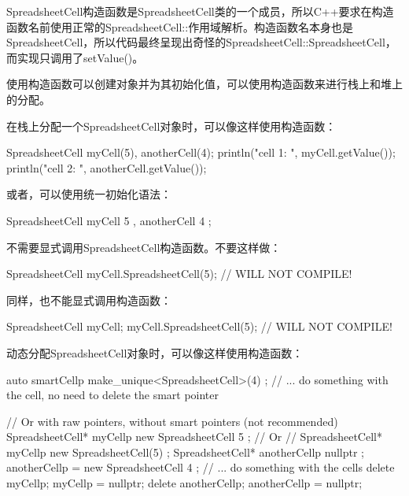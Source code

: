 SpreadsheetCell构造函数是SpreadsheetCell类的一个成员，所以C++要求在构造函数名前使用正常的SpreadsheetCell::作用域解析。构造函数名本身也是SpreadsheetCell，所以代码最终呈现出奇怪的SpreadsheetCell::SpreadsheetCell，而实现只调用了setValue()。


使用构造函数可以创建对象并为其初始化值，可以使用构造函数来进行栈上和堆上的分配。


在栈上分配一个SpreadsheetCell对象时，可以像这样使用构造函数：

\begin{cpp}
SpreadsheetCell myCell(5), anotherCell(4);
println("cell 1: {}", myCell.getValue());
println("cell 2: {}", anotherCell.getValue());
\end{cpp}

或者，可以使用统一初始化语法：

\begin{cpp}
SpreadsheetCell myCell { 5 }, anotherCell { 4 };
\end{cpp}

不需要显式调用SpreadsheetCell构造函数。不要这样做：

\begin{cpp}
SpreadsheetCell myCell.SpreadsheetCell(5); // WILL NOT COMPILE!
\end{cpp}

同样，也不能显式调用构造函数：

\begin{cpp}
SpreadsheetCell myCell;
myCell.SpreadsheetCell(5); // WILL NOT COMPILE!
\end{cpp}


动态分配SpreadsheetCell对象时，可以像这样使用构造函数：

\begin{cpp}
auto smartCellp { make_unique<SpreadsheetCell>(4) };
// ... do something with the cell, no need to delete the smart pointer

// Or with raw pointers, without smart pointers (not recommended)
SpreadsheetCell* myCellp { new SpreadsheetCell { 5 } };
// Or
// SpreadsheetCell* myCellp{ new SpreadsheetCell(5) };
SpreadsheetCell* anotherCellp { nullptr };
anotherCellp = new SpreadsheetCell { 4 };
// ... do something with the cells
delete myCellp; myCellp = nullptr;
delete anotherCellp; anotherCellp = nullptr;
\end{cpp}

